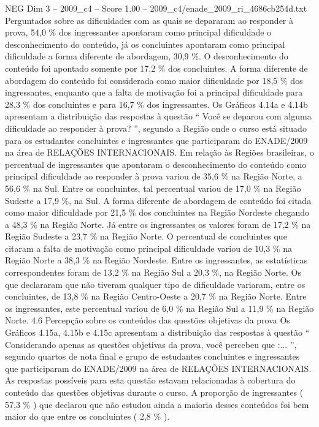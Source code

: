 \begin{textsample}{NEG Dim 3 – 2009\_c4 – Score 1.00 – 2009\_c4/enade\_2009\_ri\_4686cb254d.txt}
Perguntados sobre as dificuldades com as quais se depararam ao responder à prova, 54,0 \% dos ingressantes apontaram como principal dificuldade o desconhecimento do conteúdo, já os concluintes apontaram como principal dificuldade a forma diferente de abordagem, 30,9 \%.
O desconhecimento do conteúdo foi apontado somente por 17,2 \% dos concluintes.
A forma diferente de abordagem do conteúdo foi considerada como maior dificuldade por 18,5 \% dos ingressantes, enquanto que a falta de motivação foi a principal dificuldade para 28,3 \% dos concluintes e para 16,7 \% dos ingressantes.
Os Gráficos 4.14a e 4.14b apresentam a distribuição das respostas à questão “ Você se deparou com alguma dificuldade ao responder à prova? ”, segundo a Região onde o curso está situado para os estudantes concluintes e ingressantes que participaram do ENADE/2009 na área de RELAÇÕES INTERNACIONAIS.
Em relação às Regiões brasileiras, o percentual de ingressantes que apontaram o desconhecimento do conteúdo como principal dificuldade ao responder à prova variou de 35,6 \% na Região Norte, a 56,6 \% na Sul.
Entre os concluintes, tal percentual variou de 17,0 \% na Região Sudeste a 17,9 \%, na Sul.
A forma diferente de abordagem de conteúdo foi citada como maior dificuldade por 21,5 \% dos concluintes na Região Nordeste chegando a 48,3 \% na Região Norte.
Já entre os ingressantes os valores foram de 17,2 \% na Região Sudeste a 23,7 \% na Região Norte.
O percentual de concluintes que citaram a falta de motivação como principal dificuldade variou de 10,3 \% na Região Norte a 38,3 \% na Região Nordeste.
Entre os ingressantes, as estatísticas correspondentes foram de 13,2 \% na Região Sul a 20,3 \%, na Região Norte.
Os que declararam que não tiveram qualquer tipo de dificuldade variaram, entre os concluintes, de 13,8 \% na Região Centro-Oeste a 20,7 \% na Região Norte.
Entre os ingressantes, este percentual variou de 6,0 \% na Região Sul a 11,9 \% na Região Norte. 4.6 Percepção sobre os conteúdos das questões objetivas da prova Os Gráficos 4.15a, 4.15b e 4.15c apresentam a distribuição das respostas à questão “ Considerando apenas as questões objetivas da prova, você percebeu que :... ”, segundo quartos de nota final e grupo de estudantes concluintes e ingressantes que participaram do ENADE/2009 na área de RELAÇÕES INTERNACIONAIS.
As respostas possíveis para esta questão estavam relacionadas à cobertura do conteúdo das questões objetivas durante o curso.
A proporção de ingressantes ( 57,3 \% ) que declarou que não estudou ainda a maioria desses conteúdos foi bem maior do que entre os concluintes ( 2,8 \% ).

\end{textsample}
